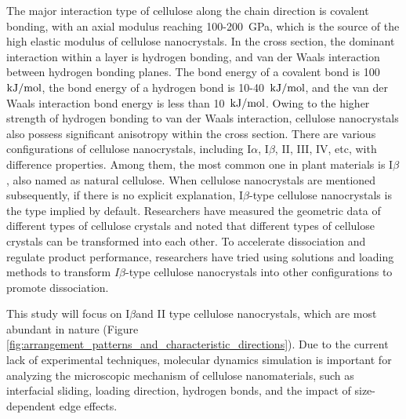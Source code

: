 \documentclass{article}
\begin{document}
The major interaction type of cellulose along the chain direction is covalent bonding, with an axial modulus reaching 100-200~GPa, which is the source of the high elastic modulus of cellulose nanocrystals.
In the cross section, the dominant interaction within a layer is hydrogen bonding, and van der Waals interaction between hydrogen bonding planes.
The bond energy of a covalent bond is 100 $\rm{kJ/mol}$, the bond energy of a hydrogen bond is 10-40~$\rm{kJ/mol}$, and the van der Waals interaction bond energy is less than 10~$\rm{kJ/mol}$.
Owing to the higher strength of hydrogen bonding to van der Waals interaction, cellulose nanocrystals also possess significant anisotropy within the cross section.
There are various configurations of cellulose nanocrystals, including I$\alpha$, I$\beta$, II, III, IV, etc, with difference properties.
Among them, the most common one in plant materials is I$\beta$,  also named as natural cellulose\cite{kim2015review}.
When cellulose nanocrystals are mentioned subsequently, if there is no explicit explanation, I$\beta$-type cellulose nanocrystals is the type implied by default.
Researchers have measured the geometric data of different types of cellulose crystals\cite{nishiyama2002crystal,nishiyama2003crystal,langan1999revised} and noted that different types of cellulose crystals can be transformed into each other\cite{chundawat2011restructuring,el2011crystal,kobayashi2011crystal,miyamoto2015molecular,kugo2024elucidating}.
To accelerate dissociation and regulate product performance, researchers have tried using solutions\cite{chundawat2011restructuring,el2011crystal,kobayashi2011crystal,uto2019molecular} and loading\cite{chen2018ialpha} methods to transform $I\beta$-type cellulose nanocrystals into other configurations to promote dissociation.

This study will focus on I$\beta$and II type cellulose nanocrystals, which are most abundant in nature (Figure \ref{fig:arrangement_patterns_and_characteristic_directions}).
Due to the current lack of experimental techniques, molecular dynamics simulation is important for analyzing the microscopic mechanism of cellulose nanomaterials, such as interfacial sliding\cite{wu2013atomistic}, loading direction\cite{zhang2021hydrogen,wu2014tensile}, hydrogen bonds\cite{zhang2021hydrogen}, and the impact of size-dependent edge effects\cite{sinko2014dimensions}.
\end{document}
